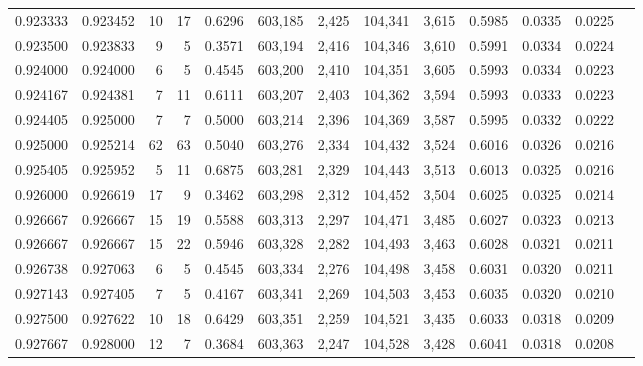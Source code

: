 \begin{tabular}{rrrrrrrrrrrrr}
0.923333 & 0.923452 &    10 &  17 &                                     0.6296 & 603,185 &   2,425 & 104,341 &   3,615 & 0.5985 & 0.0335 & 0.0225 \\
0.923500 & 0.923833 &     9 &   5 &                                     0.3571 & 603,194 &   2,416 & 104,346 &   3,610 & 0.5991 & 0.0334 & 0.0224 \\
0.924000 & 0.924000 &     6 &   5 &                                     0.4545 & 603,200 &   2,410 & 104,351 &   3,605 & 0.5993 & 0.0334 & 0.0223 \\
0.924167 & 0.924381 &     7 &  11 &                                     0.6111 & 603,207 &   2,403 & 104,362 &   3,594 & 0.5993 & 0.0333 & 0.0223 \\
0.924405 & 0.925000 &     7 &   7 &                                     0.5000 & 603,214 &   2,396 & 104,369 &   3,587 & 0.5995 & 0.0332 & 0.0222 \\
0.925000 & 0.925214 &    62 &  63 &                                     0.5040 & 603,276 &   2,334 & 104,432 &   3,524 & 0.6016 & 0.0326 & 0.0216 \\
0.925405 & 0.925952 &     5 &  11 &                                     0.6875 & 603,281 &   2,329 & 104,443 &   3,513 & 0.6013 & 0.0325 & 0.0216 \\
0.926000 & 0.926619 &    17 &   9 &                                     0.3462 & 603,298 &   2,312 & 104,452 &   3,504 & 0.6025 & 0.0325 & 0.0214 \\
0.926667 & 0.926667 &    15 &  19 &                                     0.5588 & 603,313 &   2,297 & 104,471 &   3,485 & 0.6027 & 0.0323 & 0.0213 \\
0.926667 & 0.926667 &    15 &  22 &                                     0.5946 & 603,328 &   2,282 & 104,493 &   3,463 & 0.6028 & 0.0321 & 0.0211 \\
0.926738 & 0.927063 &     6 &   5 &                                     0.4545 & 603,334 &   2,276 & 104,498 &   3,458 & 0.6031 & 0.0320 & 0.0211 \\
0.927143 & 0.927405 &     7 &   5 &                                     0.4167 & 603,341 &   2,269 & 104,503 &   3,453 & 0.6035 & 0.0320 & 0.0210 \\
0.927500 & 0.927622 &    10 &  18 &                                     0.6429 & 603,351 &   2,259 & 104,521 &   3,435 & 0.6033 & 0.0318 & 0.0209 \\
0.927667 & 0.928000 &    12 &   7 &                                     0.3684 & 603,363 &   2,247 & 104,528 &   3,428 & 0.6041 & 0.0318 & 0.0208 \\

\end{tabular}
